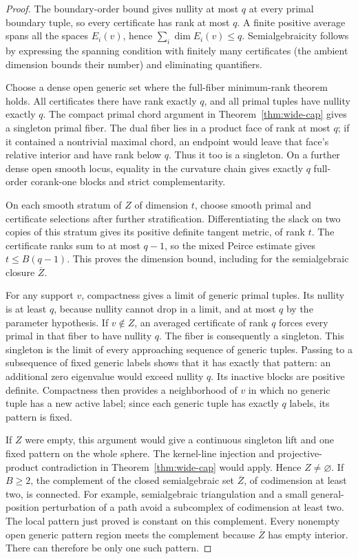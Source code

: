 \begin{proof}
The boundary-order bound gives nullity at most $q$ at every primal
boundary tuple, so every certificate has rank at most $q$. A finite
positive average spans all the spaces $E_i(v)$, hence
$\sum_i\dim E_i(v)\leq q$. Semialgebraicity follows by expressing the
spanning condition with finitely many certificates (the ambient dimension
bounds their number) and eliminating quantifiers.

Choose a dense open generic set where the full-fiber minimum-rank theorem
holds. All certificates there have rank exactly $q$, and all primal
tuples have nullity exactly $q$. The compact primal chord argument in
Theorem~\ref{thm:wide-cap} gives a singleton primal fiber. The dual fiber
lies in a product face of rank at most $q$; if it contained a nontrivial
maximal chord, an endpoint would leave that face's relative interior and
have rank below $q$. Thus it too is a singleton. On a further dense open
smooth locus, equality in the curvature chain gives exactly $q$
full-order corank-one blocks and strict complementarity.

On each smooth stratum of $Z$ of dimension $t$, choose smooth primal and
certificate selections after further stratification. Differentiating the
slack on two copies of this stratum gives its positive definite tangent
metric, of rank $t$. The certificate ranks sum to at most $q-1$, so the
mixed Peirce estimate gives $t\leq B(q-1)$. This proves the dimension
bound, including for the semialgebraic closure $\overline Z$.

For any support $v$, compactness gives a limit of generic primal tuples.
Its nullity is at least $q$, because nullity cannot drop in a limit, and at
most $q$ by the parameter hypothesis. If $v\notin Z$, an averaged
certificate of rank $q$ forces every primal in that fiber to have
nullity $q$. The fiber is consequently a singleton. This singleton is
the limit of every approaching sequence of generic tuples. Passing to
a subsequence of fixed generic labels shows that it has exactly that
pattern: an additional zero eigenvalue would exceed nullity $q$.
Its inactive blocks are positive definite. Compactness then provides a
neighborhood of $v$ in which no generic tuple has a new active label;
since each generic tuple has exactly $q$ labels, its pattern is fixed.

If $Z$ were empty, this argument would give a continuous singleton lift
and one fixed pattern on the whole sphere. The kernel-line injection
and projective-product contradiction in Theorem~\ref{thm:wide-cap}
would apply. Hence $Z\ne\varnothing$.
If $B\geq2$, the complement of the closed semialgebraic set
$\overline Z$, of codimension at least two, is connected. For example,
semialgebraic triangulation and a small general-position perturbation
of a path avoid a subcomplex of codimension at least two. The local
pattern just proved is constant on this complement. Every nonempty
open generic pattern region meets the complement because
$\overline Z$ has empty interior. There can therefore be only one
such pattern.
\end{proof}

